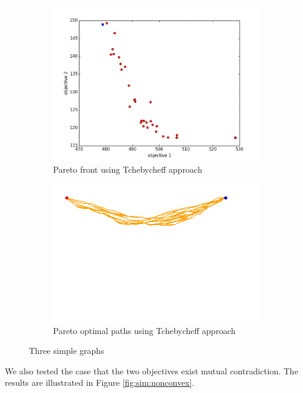 \documentclass[conference]{IEEEtran}
\begin{document}
\begin{figure}
\begin{subfigure}[b]{0.45\linewidth}
		\includegraphics[width=\textwidth]{fig/sim5-obstacle/PF05-MORRT2.png}
		\caption{Pareto front using Tchebycheff approach}
		\label{fig:sim:obs:pf:b}
	\end{subfigure} 
	\begin{subfigure}[b]{0.45\linewidth}
		\centering
		\includegraphics[width=\textwidth]{fig/sim5-obstacle/MORRTstar01-ALL.png}
		\caption{Pareto optimal paths using Tchebycheff approach}
		\label{fig:sim:obs:sols:b}
	\end{subfigure}
	\caption{Three simple graphs}
	\label{fig:sim:obs}
\end{figure}

We also tested the case that the two objectives exist mutual contradiction.
The results are illustrated in Figure \ref{fig:sim:nonconvex}.
\end{document}
